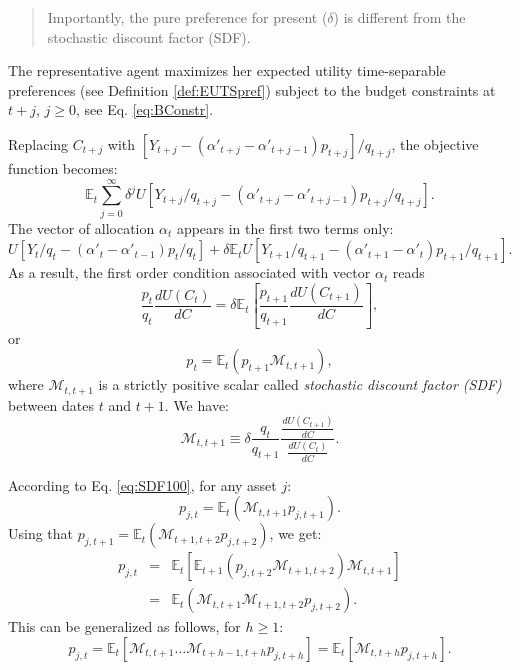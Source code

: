 \documentclass[
  12pt,
]{book}
\theoremstyle{definition}
\theoremstyle{definition}
\theoremstyle{definition}
\theoremstyle{definition}
\theoremstyle{remark}
\begin{document}
\begin{quote}
Importantly, the pure preference for present (\(\delta\)) is different from the stochastic discount factor (SDF).
\end{quote}

The representative agent maximizes her expected utility time-separable preferences (see Definition \ref{def:EUTSpref}) subject to the budget constraints at \(t+j\), \(j \ge 0\), see Eq. \eqref{eq:BConstr}.

Replacing \(C_{t+j}\) with \([Y_{t+j}-(\alpha'_{t+j}-\alpha'_{t+j-1})p_{t+j}]/q_{t+j}\), the objective function becomes:
\[
\mathbb{E}_t  \sum^\infty_{j=0} \delta^j U
[Y_{t+j}/q_{t+j}-(\alpha'_{t+j}-\alpha'_{t+j-1})p_{t+j}/q_{t+j}].
\]
The vector of allocation \(\alpha_t\) appears in the first two terms only:
\[
U[Y_t/q_t-(\alpha'_t-\alpha'_{t-1})p_t/q_t] + \delta \mathbb{E}_t
U[Y_{t+1}/q_{t+1}-(\alpha'_{t+1}-\alpha'_t)p_{t+1}/q_{t+1}].
\]
As a result, the first order condition associated with vector \(\alpha_t\) reads
\[
\frac{p_t}{q_t}  \frac{d U(C_t)}{dC} = \delta \mathbb{E}_t \left[
\frac{p_{t+1}}{q_{t+1}}  \frac{dU(C_{t+1})}{dC}
\right],
\]
or
\begin{equation}
p_t = \mathbb{E}_t(p_{t+1} \mathcal{M}_{t,t+1}),\label{eq:SDF100}
\end{equation}
where \(\mathcal{M}_{t,t+1}\) is a strictly positive scalar called \emph{stochastic discount factor (SDF)} between dates \(t\) and \(t+1\). We have:
\begin{equation}
\boxed{\mathcal{M}_{t,t+1} \equiv \delta  \frac{q_t}{q_{t+1}}
\frac{  \frac{dU(C_{t+1})}{dC}} {
\frac{dU(C_t)}{dC}}.}\label{eq:SDFCCAPM}
\end{equation}

According to Eq. \eqref{eq:SDF100}, for any asset \(j\):
\begin{equation}
p_{j,t} = \mathbb{E}_t(\mathcal{M}_{t,t+1} p_{j,t+1}).\label{eq:Mbasicpricing}
\end{equation}
Using that \(p_{j,t+1} = \mathbb{E}_t(\mathcal{M}_{t+1,t+2} p_{j,t+2})\), we get:
\begin{eqnarray*}
p_{j,t} &=& \mathbb{E}_t[\mathbb{E}_{t+1}(p_{j,t+2}\mathcal{M}_{t+1,t+2})\mathcal{M}_{t,t+1}] \\
&=& \mathbb{E}_t(\mathcal{M}_{t,t+1} \mathcal{M}_{t+1,t+2}p_{j,t+2}).
\end{eqnarray*}
This can be generalized as follows, for \(h \ge 1\):
\[
p_{j,t} = \mathbb{E}_t[\mathcal{M}_{t,t+1} \dots \mathcal{M}_{t+h-1,t+h}p_{j,t+h}] = \mathbb{E}_t[\mathcal{M}_{t,t+h}p_{j,t+h}].
\]
\end{document}
